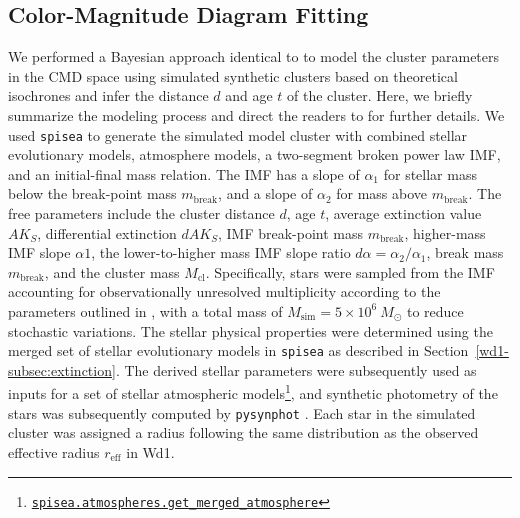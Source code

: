 \documentclass[12pt]{ucsddissertation}
\newcommand{\reff}{r_\mathrm{eff}}
\begin{document}
\begin{CJK*}{UTF8}{gbsn}
\subsection{Color-Magnitude Diagram Fitting}
\label{wd1-subsec:cmd_fitting}
We performed a Bayesian approach identical to \citet{Hosek-2019} to model the cluster parameters in the CMD space using simulated synthetic clusters based on theoretical isochrones and infer the distance $d$ and age $t$ of the cluster. Here, we briefly summarize the modeling process and direct the readers to \citet{Hosek-2019} for further details. We used \texttt{spisea} \citep[][]{spisea} to generate the simulated model cluster with combined stellar evolutionary models, atmosphere models, a two-segment broken power law IMF, and an initial-final mass relation. The IMF has a slope of $\alpha_1$ for stellar mass below the break-point mass $m_\mathrm{break}$, and a slope of $\alpha_2$ for mass above $m_\mathrm{break}$. The free parameters include the cluster distance $d$, age $t$, average extinction value $AK_S$, differential extinction $dAK_S$, IMF break-point mass $m_\mathrm{break}$, higher-mass IMF slope $\alpha1$, the lower-to-higher mass IMF slope ratio $d\alpha=\alpha_2/\alpha_1$, break mass $m_\mathrm{break}$, and the cluster mass $M_\mathrm{cl}$. Specifically, stars were sampled from the IMF accounting for observationally unresolved multiplicity according to the parameters outlined in \citet{Lu-2013}, with a total mass of $M_\mathrm{sim} = 5\times10^6~M_\odot$ to reduce stochastic variations. The stellar physical properties were determined using the merged set of stellar evolutionary models in \texttt{spisea} as described in Section~\ref{wd1-subsec:extinction}. The derived stellar parameters were subsequently used as inputs for a set of stellar atmospheric models\footnote{\href{https://spisea.readthedocs.io/en/latest/atmo_models.html\#atmospheres.get\_merged\_atmosphere}{\texttt{spisea.atmospheres.get\_merged\_atmosphere}}}, and synthetic photometry of the stars was subsequently computed by \texttt{pysynphot} \citep[][]{pysynphot}. Each star in the simulated cluster was assigned a radius following the same distribution as the observed effective radius $\reff$ in Wd1.


\end{CJK*}
\end{document}
